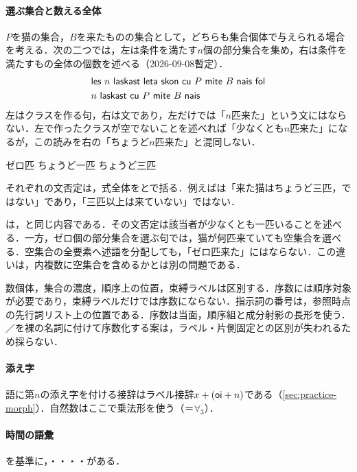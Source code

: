 \documentclass[../../main-detail.tex]{subfiles}
\begin{document}
\paragraph{選ぶ集合と数える全体}
$P$を猫の集合，$B$を来たものの集合として，どちらも集合個体で与えられる場合を考える．次の二つでは，左は条件を満たす$n$個の部分集合を集め，右は条件を満たすもの全体の個数を述べる（2026-09-08暫定）．
\begin{align*}
 &\textsf{les $n$ laskast leta skon cu $P$ mite $B$ nais fol}\\
 &\textsf{$n$ laskast cu $P$ mite $B$ nais}
\end{align*}
左はクラスを作る句，右は文であり，左だけでは「$n$匹来た」という文にはならない．左で作ったクラスが空でないことを述べれば「少なくとも$n$匹来た」になるが，この読みを右の「ちょうど$n$匹来た」と混同しない．

\begin{exe}
 \ex {}\hfill ゼロ匹
 \ex {}\hfill ちょうど一匹
 \ex {}\hfill ちょうど三匹
\end{exe}
それぞれの文否定は，式全体をとで括る．例えばは「来た猫はちょうど三匹，ではない」であり，「三匹以上は来ていない」ではない．

\begin{remark}[ゼロ数量]
は，と同じ内容である．その文否定は該当者が少なくとも一匹いることを述べる．一方，ゼロ個の部分集合を選ぶ句では，猫が何匹来ていても空集合を選べる．空集合の全要素へ述語を分配しても，「ゼロ匹来た」にはならない．この違いは，内複数に空集合を含めるかとは別の問題である．
\end{remark}

数個体，集合の濃度，順序上の位置，束縛ラベルは区別する．序数には順序対象が必要であり，束縛ラベルだけでは序数にならない．指示詞の番号は，参照時点の先行詞リスト上の位置である．序数は当面，順序組と成分射影の長形を使う．／を裸の名詞に付けて序数化する案は，ラベル・片側固定との区別が失われるため採らない．

\paragraph{添え字}
語に第$n$の添え字を付ける接辞はラベル接辞$x+(\textsf{oi}+n)$である（\ref{sec:practice-morph}）．自然数はここで乗法形を使う（＝$\forall_3$）．

\paragraph{時間の語彙}
を基準に，・・・・がある．
\end{document}
